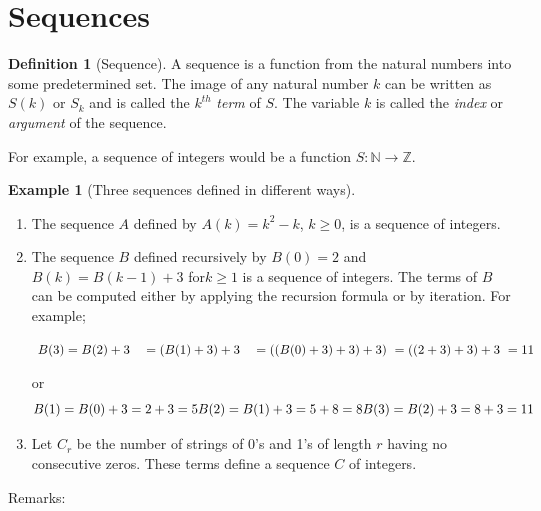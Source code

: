 \documentclass[10pt,]{book}
\theoremstyle{plain}
\theoremstyle{definition}
\newtheorem{definition}[theorem]{Definition}
\theoremstyle{definition}
\theoremstyle{definition}
\newtheorem{example}[theorem]{Example}
\theoremstyle{definition}
\numberwithin{equation}{section}
\begin{document}
\par\smallskip\noindent
\typeout{************************************************}
\typeout{************************************************}
\section[Sequences]{Sequences}\label{s-Sequences}
\begin{definition}[Sequence]\label{def-sequence}
A sequence is a function from the natural numbers into some predetermined set. The image of any natural number \(k\) can be written  as \(S(k)\) or \(S_k\) and is called the \(k^{th}\)  \emph{term}  of \(S\). The variable
\(k\) is called the  \emph{index}  or  \emph{argument}  of the sequence.
%
\end{definition}
For example, a sequence of integers would be a function \(S:\mathbb{N}\to \mathbb{Z}\).%
\begin{example}[Three sequences defined in different ways]\label{ex-three-sequences}
\leavevmode%
\begin{enumerate}[label=\alph*]
\item\hypertarget{li-16}{} The sequence \(A\) defined by \(A(k) = k^2 - k\),  \(k \geq  0\), is a sequence of integers.%
\item\hypertarget{li-17}{} The sequence \(B\) defined recursively by \(B(0) = 2\) and \(B(k) = B(k - 1) + 3\) for\(k \geq  1\) is a sequence of integers. The terms of \(B\) can be computed either by applying the recursion formula or by iteration. For example;

\(\text{         }B(3) = B(2) + 3\quad =(B(1)+3)+3\quad = ((B(0)+3)+3)+3)\\
\\
\text{    }=((2+3)+3)+3\\
\\
\text{    }=11\)

or
\[B(1) = B(0) + 3 = 2 + 3 = 5\\
B(2) = B(1) + 3 = 5 + 8 = 8\\
B(3) = B(2) + 3 = 8 + 3 = 11\]%
\item\hypertarget{li-18}{}Let \(C_r\) be the number of strings of 0's and 1's of length \(r\) having no consecutive zeros. These terms define a sequence \(C\) of integers.%
\end{enumerate}
%
\end{example}
\par
Remarks:%
\par
\end{document}
